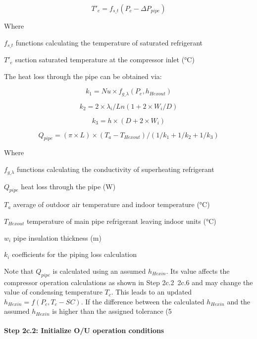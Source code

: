 \begin{equation}
  T'_e=f_{s\_t}(P_e-\Delta{P_{pipe}})
\end{equation}

Where

$f_{s\_t}$	functions calculating the temperature of saturated refrigerant

$T'_e$   	suction saturated temperature at the compressor inlet (°C)

The heat loss through the pipe can be obtained via:

\begin{equation}
k_1=Nu\times{f_{g\_\lambda}(P_e,h_{Hexout})}
\end{equation}

\begin{equation}k_2=2\times{\lambda_i}/Ln(1+2\times{W_i}/D)\end{equation}

\begin{equation}k_3=h\times(D+2\times{W_i})\end{equation}

\begin{equation}Q_{pipe}=(\pi\times{L})\times(T_a-T_{Hexout})/(1/k_1+1/k_2+1/k_3)\end{equation}

Where

$f_{g\_\lambda}$	functions calculating the conductivity of superheating refrigerant 

$Q_{pipe}$ 	heat loss through the pipe (W)

$T_a$ 	average of outdoor air temperature and indoor temperature (°C)

$T_{Hexout}$	temperature of main pipe refrigerant leaving indoor units (°C) 

$w_i$	pipe insulation thickness (m) 

$k_i$	coefficients for the piping loss calculation  

Note that $Q_{pipe}$ is calculated using an assumed $h_{Hexin}$. Its value affects the compressor operation calculations as shown in Step 2c.2~2c.6 and may change the value of condensing temperature $T_c$. This leads to an updated $h_{Hexin}=f(P_c,T_c-SC)$. If the difference between the calculated $h_{Hexin}$ and the assumed $h_{Hexin}$ is higher than the assigned tolerance (5%

\paragraph{Step 2c.2: Initialize O/U operation conditions}\label{step-2c.2-initialize-ou-operation-conditions}

